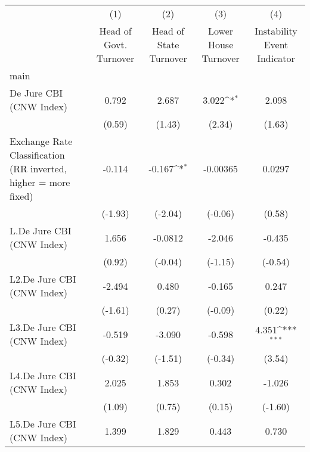 {
\def\sym#1{\ifmmode^{#1}\else\(^{#1}\)\fi}
\begin{longtable}{l*{4}{c}}
\hline\hline\endfirsthead\hline\endhead\hline\endfoot\endlastfoot
                &\multicolumn{1}{c}{(1)}&\multicolumn{1}{c}{(2)}&\multicolumn{1}{c}{(3)}&\multicolumn{1}{c}{(4)}\\
                &\multicolumn{1}{c}{Head of Govt. Turnover}&\multicolumn{1}{c}{Head of State Turnover}&\multicolumn{1}{c}{Lower House Turnover}&\multicolumn{1}{c}{Instability Event Indicator}\\
\hline
main            &                  &                  &                  &                  \\
De Jure CBI (CNW Index)&    0.792         &    2.687         &    3.022\sym{*}  &    2.098         \\
                &   (0.59)         &   (1.43)         &   (2.34)         &   (1.63)         \\
[1em]
Exchange Rate Classification (RR inverted, higher = more fixed)&   -0.114         &   -0.167\sym{*}  & -0.00365         &   0.0297         \\
                &  (-1.93)         &  (-2.04)         &  (-0.06)         &   (0.58)         \\
[1em]
L.De Jure CBI (CNW Index)&    1.656         &  -0.0812         &   -2.046         &   -0.435         \\
                &   (0.92)         &  (-0.04)         &  (-1.15)         &  (-0.54)         \\
[1em]
L2.De Jure CBI (CNW Index)&   -2.494         &    0.480         &   -0.165         &    0.247         \\
                &  (-1.61)         &   (0.27)         &  (-0.09)         &   (0.22)         \\
[1em]
L3.De Jure CBI (CNW Index)&   -0.519         &   -3.090         &   -0.598         &    4.351\sym{***}\\
                &  (-0.32)         &  (-1.51)         &  (-0.34)         &   (3.54)         \\
[1em]
L4.De Jure CBI (CNW Index)&    2.025         &    1.853         &    0.302         &   -1.026         \\
                &   (1.09)         &   (0.75)         &   (0.15)         &  (-1.60)         \\
[1em]
L5.De Jure CBI (CNW Index)&    1.399         &    1.829         &    0.443         &    0.730         \\

\end{longtable}}
